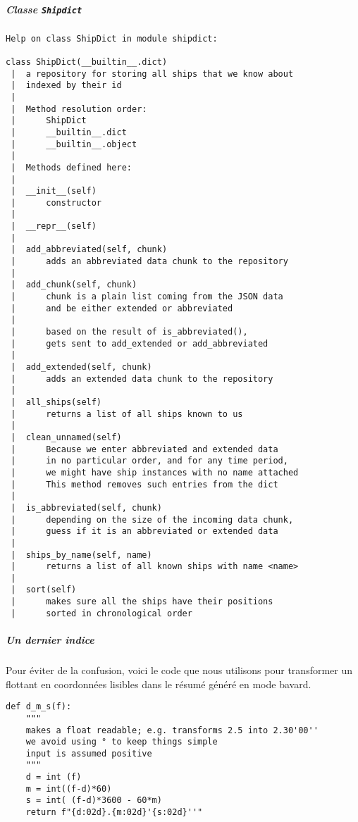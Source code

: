     \hypertarget{classe-shipdict}{%
\subparagraph{\texorpdfstring{Classe
\texttt{Shipdict}}{Classe Shipdict}}\label{classe-shipdict}}

    \begin{verbatim}
Help on class ShipDict in module shipdict:

class ShipDict(__builtin__.dict)
 |  a repository for storing all ships that we know about
 |  indexed by their id
 |  
 |  Method resolution order:
 |      ShipDict
 |      __builtin__.dict
 |      __builtin__.object
 |  
 |  Methods defined here:
 |  
 |  __init__(self)
 |      constructor
 |  
 |  __repr__(self)
 |  
 |  add_abbreviated(self, chunk)
 |      adds an abbreviated data chunk to the repository
 |  
 |  add_chunk(self, chunk)
 |      chunk is a plain list coming from the JSON data
 |      and be either extended or abbreviated
 |      
 |      based on the result of is_abbreviated(), 
 |      gets sent to add_extended or add_abbreviated
 |  
 |  add_extended(self, chunk)
 |      adds an extended data chunk to the repository
 |  
 |  all_ships(self)
 |      returns a list of all ships known to us
 |  
 |  clean_unnamed(self)
 |      Because we enter abbreviated and extended data
 |      in no particular order, and for any time period,
 |      we might have ship instances with no name attached
 |      This method removes such entries from the dict
 |  
 |  is_abbreviated(self, chunk)
 |      depending on the size of the incoming data chunk, 
 |      guess if it is an abbreviated or extended data
 |  
 |  ships_by_name(self, name)
 |      returns a list of all known ships with name <name>
 |  
 |  sort(self)
 |      makes sure all the ships have their positions
 |      sorted in chronological order
\end{verbatim}

    \hypertarget{un-dernier-indice}{%
\subparagraph{Un dernier indice}\label{un-dernier-indice}}

    Pour éviter de la confusion, voici le code que nous utilisons pour
transformer un flottant en coordonnées lisibles dans le résumé généré en
mode bavard.

    \begin{verbatim}
def d_m_s(f):
    """
    makes a float readable; e.g. transforms 2.5 into 2.30'00'' 
    we avoid using ° to keep things simple
    input is assumed positive
    """
    d = int (f)
    m = int((f-d)*60)
    s = int( (f-d)*3600 - 60*m)
    return f"{d:02d}.{m:02d}'{s:02d}''"
\end{verbatim}


    
    
    
